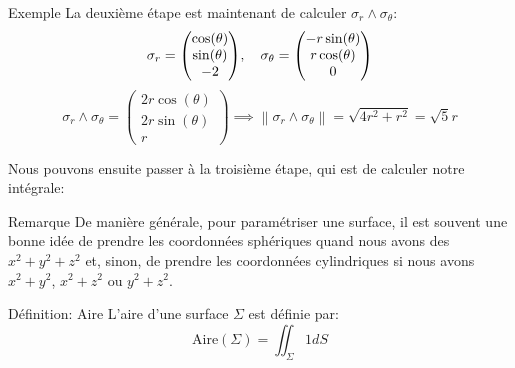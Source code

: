 \documentclass[a4paper]{article}
\begin{document}
\begin{parag}{Exemple}
    La deuxième étape est maintenant de calculer $\sigma_r \wedge \sigma_{\theta}$: 
    \[\sigma_r = \begin{pmatrix} \cos\left(\theta\right) \\ \sin\left(\theta\right)  \\ -2 \end{pmatrix}, \mathspace \sigma_{\theta} = \begin{pmatrix} -r\sin\left(\theta\right) \\ r\cos\left(\theta\right) \\ 0 \end{pmatrix}\]
    \[\sigma_r \wedge \sigma_{\theta} = \begin{pmatrix} 2r\cos\left(\theta\right) \\ 2r\sin\left(\theta\right) \\ r \end{pmatrix} \implies \left\|\sigma_r \wedge \sigma_\theta\right\| = \sqrt{4r^2 + r^2} = \sqrt{5}r\]

    Nous pouvons ensuite passer à la troisième étape, qui est de calculer notre intégrale: 
\end{parag}

\begin{parag}{Remarque}
    De manière générale, pour paramétriser une surface, il est souvent une bonne idée de prendre les coordonnées sphériques quand nous avons des $x^2 + y^2 + z^2$ et, sinon, de prendre les coordonnées cylindriques si nous avons $x^2 + y^2$, $x^2 + z^2$ ou $y^2 + z^2$.
\end{parag}

\begin{parag}{Définition: Aire}
    L'aire d'une surface $\Sigma$ est définie par: 
    \[\text{Aire}\left(\Sigma\right) = \iint_{\Sigma} 1 dS\]
\end{parag}
\end{document}
